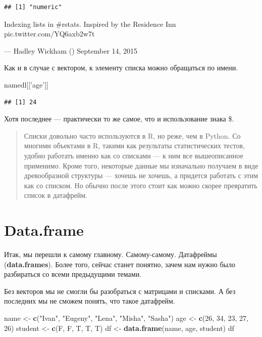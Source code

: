 \documentclass[]{book}
\newenvironment{Shaded}{\begin{snugshade}}{\end{snugshade}}
\newcommand{\KeywordTok}[1]{\textcolor[rgb]{0.13,0.29,0.53}{\textbf{#1}}}
\newcommand{\DecValTok}[1]{\textcolor[rgb]{0.00,0.00,0.81}{#1}}
\newcommand{\StringTok}[1]{\textcolor[rgb]{0.31,0.60,0.02}{#1}}
\newcommand{\NormalTok}[1]{#1}
\begin{document}
\begin{verbatim}
## [1] "numeric"
\end{verbatim}

Indexing lists in \#rstats. Inspired by the Residence Inn
pic.twitter.com/YQ6axb2w7t

--- Hadley Wickham (\citet{hadleywickham}) September 14, 2015

Как и в случае с вектором, к элементу списка можно обращаться по имени.

\begin{Shaded}
\begin{Highlighting}[]
\NormalTok{namedl[[}\StringTok{'age'}\NormalTok{]]}
\end{Highlighting}
\end{Shaded}

\begin{verbatim}
## [1] 24
\end{verbatim}

Хотя последнее --- практически то же самое, что и использование знака
\$.

\begin{quote}
Списки довольно часто используются в R, но реже, чем в Python. Со
многими объектами в R, такими как результаты статистических тестов,
удобно работать именно как со списками --- к ним все вышеописанное
применимо. Кроме того, некоторые данные мы изначально получаем в виде
древообразной структуры --- хочешь не хочешь, а придется работать с этим
как со списком. Но обычно после этого стоит как можно скорее превратить
список в датафрейм.
\end{quote}

\section{Data.frame}\label{df}

Итак, мы перешли к самому главному. Самому-самому. Датафреймы
(\textbf{data.frames}). Более того, сейчас станет понятно, зачем нам
нужно было разбираться со всеми предыдущими темами.

Без векторов мы не смогли бы разобраться с матрицами и списками. А без
последних мы не сможем понять, что такое датафрейм.

\begin{Shaded}
\begin{Highlighting}[]
\NormalTok{name <-}\StringTok{ }\KeywordTok{c}\NormalTok{(}\StringTok{"Ivan"}\NormalTok{, }\StringTok{"Eugeny"}\NormalTok{, }\StringTok{"Lena"}\NormalTok{, }\StringTok{"Misha"}\NormalTok{, }\StringTok{"Sasha"}\NormalTok{) }
\NormalTok{age <-}\StringTok{ }\KeywordTok{c}\NormalTok{(}\DecValTok{26}\NormalTok{, }\DecValTok{34}\NormalTok{, }\DecValTok{23}\NormalTok{, }\DecValTok{27}\NormalTok{, }\DecValTok{26}\NormalTok{) }
\NormalTok{student <-}\StringTok{ }\KeywordTok{c}\NormalTok{(F, F, T, T, T) }
\NormalTok{df <-}\StringTok{ }\KeywordTok{data.frame}\NormalTok{(name, age, student)  }
\NormalTok{df}
\end{Highlighting}
\end{Shaded}
\end{document}
